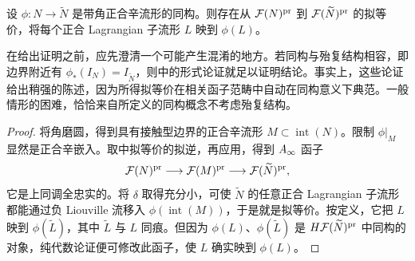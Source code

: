 \begin{corollary}\label{st:10.11}
设 $\phi:N\to\widetilde N$ 是带角正合辛流形的同构。则存在从 $\mathcal F(N)^{\mathrm{pr}}$ 到 $\mathcal F(\widetilde N)^{\mathrm{pr}}$ 的拟等价，将每个正合 Lagrangian 子流形 $L$ 映到 $\phi(L)$。
\end{corollary}
在给出证明之前，应先澄清一个可能产生混淆的地方。若同构与殆复结构相容，即边界附近有 $\phi_*(I_N)=I_{\widetilde N}$，则中的形式论证就足以证明结论。事实上，这些论证给出稍强的陈述，因为所得拟等价在相关函子范畴中自动在同构意义下典范。一般情形的困难，恰恰来自所定义的同构概念不考虑殆复结构。
\begin{proof}
将角磨圆，得到具有接触型边界的正合辛流形 $M\subset\operatorname{int}(N)$。限制 $\phi|_M$ 显然是正合辛嵌入。取中拟等价的拟逆，再应用，得到 $A_\infty$ 函子
\begin{equation}\label{eq:10.9}
\mathcal F(N)^{\mathrm{pr}}\longrightarrow\mathcal F(M)^{\mathrm{pr}}\longrightarrow\mathcal F(\widetilde N)^{\mathrm{pr}},
\end{equation}
它是上同调全忠实的。将 $\delta$ 取得充分小，可使 $\widetilde N$ 的任意正合 Lagrangian 子流形都能通过负 Liouville 流移入 $\phi(\operatorname{int}(M))$，于是就是拟等价。按定义，它把 $L$ 映到 $\phi(\widetilde L)$，其中 $\widetilde L$ 与 $L$ 同痕。但因为 $\phi(L)$、$\phi(\widetilde L)$ 是 $H\mathcal F(\widetilde N)^{\mathrm{pr}}$ 中同构的对象，纯代数论证便可修改此函子，使 $L$ 确实映到 $\phi(L)$。
\end{proof}

